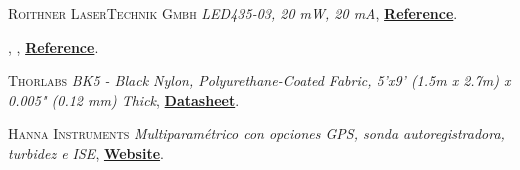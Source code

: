 \begin{thebibliography}{100}
 \textsc{Roithner LaserTechnik Gmbh}
\textit{LED435-03, 20 mW, 20 mA}, \href{http://www.roithner-laser.com/led_diverse.html}{\textbf{Reference}}.

 \textsc{},
\textit{}, \href{}{\textbf{Reference}}.

 \textsc{Thorlabs}
\textit{BK5 - Black Nylon, Polyurethane-Coated Fabric, 5'x9' (1.5m x 2.7m) x 0.005" (0.12 mm) Thick}, \href{https://www.thorlabs.com/thorproduct.cfm?partnumber=BK5}{\textbf{Datasheet}}.

 \textsc{Hanna Instruments}
\textit{Multiparamétrico con opciones GPS, sonda autoregistradora, turbidez e ISE}, \href{https://www.hannainst.es/parametros/4654-multiparametrico-portatil-con-portasondas-multisensor-ph-orp-ce-od-temperatura.html#/507-cable_m-4_m/512-portasondas-si/513-portasondas_registrador-no/514-gps-no/515-turbidez-no}{\textbf{Website}}.

\end{thebibliography}